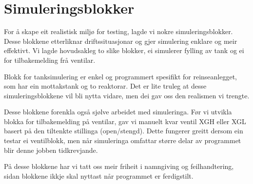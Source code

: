 \section{Simuleringsblokker}
\thispagestyle{fancy}

For å skape eit realistisk miljø for testing, lagde vi nokre simuleringsblokker.
Desse blokkene etterliknar driftssituasjonar og gjer simulering enklare og meir effektivt.
Vi lagde hovudsakleg to slike blokker, ei simulerer fylling av tank
og ei for tilbakemelding frå ventilar.

Blokk for tanksimulering er enkel og programmert spesifikt for reinseanlegget, 
som har ein mottakstank og to reaktorar.
Det er lite truleg at desse simuleringsblokkene vil bli nytta vidare, men dei gav
oss den realismen vi trengte.

Desse blokkene forenkla også sjølve arbeidet med simuleringa.
Før vi utvikla blokka for tilbakemelding på ventilar, 
gav vi manuelt kvar ventil XGH eller XGL basert på den tiltenkte stillinga (open/stengd). \newline
Dette fungerer greitt dersom ein testar ei ventilblokk, men
når simuleringa omfattar større delar av programmet blir denne jobben tidkrevjande.

På desse blokkene har vi tatt oss meir friheit i namngiving og feilhandtering, sidan blokkene ikkje skal nyttast når programmet er ferdigstilt.


